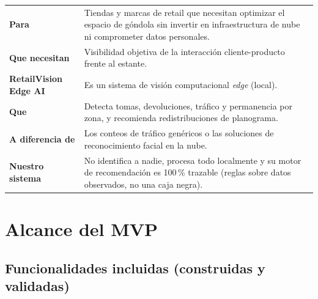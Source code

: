 \documentclass[11pt,a4paper]{report}
\begin{document}
\begin{center}
\renewcommand{\arraystretch}{1.25}
\begin{tabular}{>{\raggedright\arraybackslash}p{4.6cm} >{\raggedright\arraybackslash}p{9.4cm}}
\toprule
\rowcolor{rvCodeBg}\textbf{Para} & Tiendas y marcas de retail que necesitan optimizar el espacio
de góndola sin invertir en infraestructura de nube ni comprometer datos personales. \\
\textbf{Que necesitan} & Visibilidad objetiva de la interacción cliente-producto frente al
estante. \\
\textbf{RetailVision Edge AI} & Es un sistema de visión computacional \textit{edge} (local). \\
\textbf{Que} & Detecta tomas, devoluciones, tráfico y permanencia por zona, y recomienda
redistribuciones de planograma. \\
\textbf{A diferencia de} & Los conteos de tráfico genéricos o las soluciones de reconocimiento
facial en la nube. \\
\textbf{Nuestro sistema} & No identifica a nadie, procesa todo localmente y su motor de
recomendación es 100\,\% trazable (reglas sobre datos observados, no una caja negra). \\
\bottomrule
\end{tabular}
\end{center}

\chapter{Alcance del MVP}

\section{Funcionalidades incluidas (construidas y validadas)}
\end{document}
